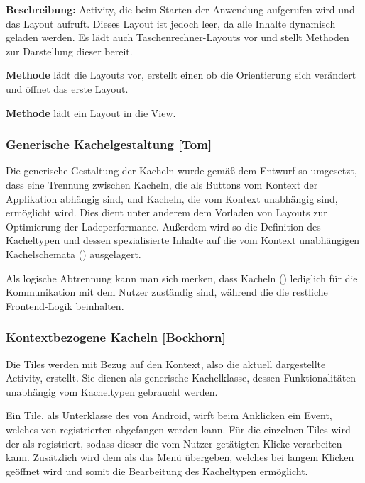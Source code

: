 \textbf{Beschreibung:} Activity, die beim Starten der Anwendung aufgerufen wird und das Layout  aufruft. Dieses Layout ist jedoch leer, da alle Inhalte dynamisch geladen werden. Es lädt auch Taschenrechner-Layouts vor und stellt Methoden zur Darstellung dieser bereit.

\textbf{Methode}  lädt die Layouts vor, erstellt einen  ob die Orientierung sich verändert und öffnet das erste Layout.

\textbf{Methode}  lädt ein Layout in die View.

\subsubsection{Generische Kachelgestaltung [Tom]}

Die generische Gestaltung der Kacheln wurde gemäß dem Entwurf so umgesetzt, dass eine Trennung zwischen Kacheln, die als Buttons vom Kontext der Applikation abhängig sind, und Kacheln, die vom Kontext unabhängig sind, ermöglicht wird. Dies dient unter anderem dem Vorladen von Layouts zur Optimierung der Ladeperformance. Außerdem wird so die Definition des Kacheltypen und dessen spezialisierte Inhalte auf die vom Kontext unabhängigen Kachelschemata () ausgelagert. 

Als logische Abtrennung kann man sich merken, dass Kacheln () lediglich für die Kommunikation mit dem Nutzer zuständig sind, während die  die restliche Frontend-Logik beinhalten.

\subsubsection{Kontextbezogene Kacheln [Bockhorn]}

Die Tiles werden mit Bezug auf den Kontext, also die aktuell dargestellte Activity, erstellt. Sie dienen als generische Kachelklasse, dessen Funktionalitäten unabhängig vom Kacheltypen gebraucht werden.

Ein Tile, als Unterklasse des  von Android, wirft beim Anklicken ein Event, welches von registrierten  abgefangen werden kann. Für die einzelnen Tiles wird der  als  registriert, sodass dieser die vom Nutzer getätigten Klicke verarbeiten kann. Zusätzlich wird dem  als  das Menü  übergeben, welches bei langem Klicken geöffnet wird und somit die Bearbeitung des Kacheltypen ermöglicht.

